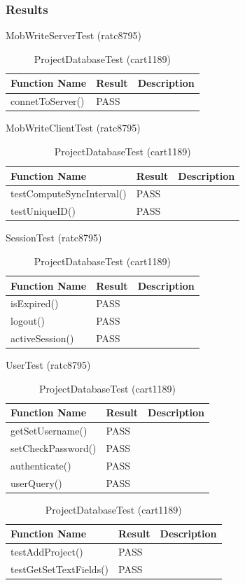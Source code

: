 \documentclass[twoside,letterpaper]{article}
\begin{document}
\subsubsection{Results}

\begin{table}[h]
	\centering
	\caption{MobWriteServerTest (ratc8795)}
	\begin{tabular}{|p{3cm}|p{3cm}|p{9cm}|}
		\hline
		\textbf{Function Name} & \textbf{Result} & \textbf{Description}  \\\hline
		connetToServer() & PASS & \\\hline
	\end{tabular}
	
	\centering
	\caption{MobWriteClientTest (ratc8795)}
	\begin{tabular}{|p{6cm}|p{3cm}|p{6cm}|}
		\hline
		\textbf{Function Name} & \textbf{Result} & \textbf{Description}  \\\hline
		testComputeSyncInterval() & PASS & \\\hline
		testUniqueID() & PASS & \\\hline
	\end{tabular}
	
	\centering
	\caption{SessionTest (ratc8795)}
	\begin{tabular}{|p{3cm}|p{3cm}|p{9cm}|}
		\hline
		\textbf{Function Name} & \textbf{Result} & \textbf{Description}  \\\hline
		isExpired() & PASS & \\\hline
		logout() & PASS & \\\hline
		activeSession() & PASS & \\\hline
	\end{tabular}

	\centering
	\caption{UserTest (ratc8795)}
	\begin{tabular}{|p{3cm}|p{3cm}|p{9cm}|}
		\hline
		\textbf{Function Name} & \textbf{Result} & \textbf{Description}  \\\hline
		getSetUsername() & PASS & \\\hline
		setCheckPassword() & PASS & \\\hline
		authenticate() & PASS & \\\hline
		userQuery() & PASS & \\\hline
	\end{tabular}

	\centering
	\caption{ProjectDatabaseTest (cart1189)}
	\begin{tabular}{|p{4cm}|p{3cm}|p{8cm}|}
		\hline
		\textbf{Function Name} & \textbf{Result} & \textbf{Description}  \\\hline
		testAddProject() & PASS & \\\hline
		testGetSetTextFields() & PASS & \\\hline
	\end{tabular}

\end{table}
\end{document}

